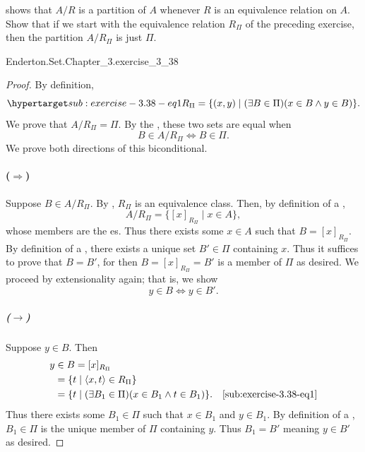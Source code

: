 \documentclass{report}
\begin{document}
   shows that $A / R$ is a partition of $A$ whenever $R$
    is an equivalence relation on $A$.
  Show that if we start with the equivalence relation $R_\Pi$ of the preceding
    exercise, then the partition $A / R_\Pi$ is just $\Pi$.

    {Enderton.Set.Chapter\_3.exercise\_3\_38}

  \begin{proof}
    By definition,
      \begin{equation}
        \hyperlabel{sub:exercise-3.38-eq1}
        R_\Pi = \{ (x, y) \mid (\exists B \in \Pi)(x \in B \land y \in B) \}.
      \end{equation}
    We prove that $A / R_\Pi = \Pi$.
    By the , these two sets are equal when
      $$B \in A / R_\Pi \iff B \in \Pi.$$
    We prove both directions of this biconditional.

    \paragraph{($\Rightarrow$)}%

      Suppose $B \in A / R_\Pi$.
      By , $R_\Pi$ is an equivalence class.
      Then, by definition of a ,
        $$A / R_\Pi = \{[x]_{R_\Pi} \mid x \in A\},$$
        whose members are the es.
      Thus there exists some $x \in A$ such that $B = [x]_{R_\Pi}$.
      By definition of a , there exists a unique set
        $B' \in \Pi$ containing $x$.
      Thus it suffices to prove that $B = B'$, for then $B = [x]_{R_\Pi} = B'$
        is a member of $\Pi$ as desired.
      We proceed by extensionality again; that is, we show
        $$y \in B \iff y \in B'.$$

      \subparagraph{($\rightarrow$)}%

        Suppose $y \in B$.
        Then
          \begin{align*}
            y
              & \in B = [x]_{R_\Pi} \\
              & = \{t \mid \left< x, t \right> \in R_\Pi\} \\
              & = \{t \mid (\exists B_1 \in \Pi)(x \in B_1 \land t \in B_1)\}.
                & \eqref{sub:exercise-3.38-eq1}
          \end{align*}
        Thus there exists some $B_1 \in \Pi$ such that $x \in B_1$ and
          $y \in B_1$.
        By definition of a , $B_1 \in \Pi$ is the unique
          member of $\Pi$ containing $y$.
        Thus $B_1 = B'$ meaning $y \in B'$ as desired.


\end{proof}
\end{document}
